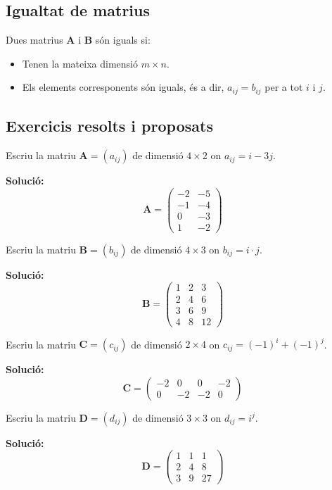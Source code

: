 \documentclass[12pt]{article}
\newcommand{\mat}[1]{\mathbf{#1}}
\begin{document}
\subsection{Igualtat de matrius}
\begin{concept}
Dues matrius $\mat{A}$ i $\mat{B}$ són iguals si:
\begin{itemize}
    \item Tenen la mateixa dimensió $m \times n$.
    \item Els elements corresponents són iguals, és a dir, $a_{ij} = b_{ij}$ per a tot $i$ i $j$.
\end{itemize}
\end{concept}

\subsection*{Exercicis resolts i proposats}
\begin{exercici}
Escriu la matriu $\mat{A} = (a_{ij})$ de dimensió $4 \times 2$ on $a_{ij} = i - 3j$.

\textbf{Solució:}
\[
\mat{A} = \begin{pmatrix}
-2 & -5 \\
-1 & -4 \\
0 & -3 \\
1 & -2
\end{pmatrix}
\]

Escriu la matriu $\mat{B} = (b_{ij})$ de dimensió $4 \times 3$ on $b_{ij} = i \cdot j$.

\textbf{Solució:}
\[
\mat{B} = \begin{pmatrix}
1 & 2 & 3 \\
2 & 4 & 6 \\
3 & 6 & 9 \\
4 & 8 & 12
\end{pmatrix}
\]

Escriu la matriu $\mat{C} = (c_{ij})$ de dimensió $2 \times 4$ on $c_{ij} = (-1)^i + (-1)^j$.

\textbf{Solució:}
\[
\mat{C} = \begin{pmatrix}
-2 & 0 & 0 & -2 \\
0 & -2 & -2 & 0
\end{pmatrix}
\]

Escriu la matriu $\mat{D} = (d_{ij})$ de dimensió $3 \times 3$ on $d_{ij} = i^j$.

\textbf{Solució:}
\[
\mat{D} = \begin{pmatrix}
1 & 1 & 1 \\
2 & 4 & 8 \\
3 & 9 & 27
\end{pmatrix}
\]
\end{exercici}
\end{document}
